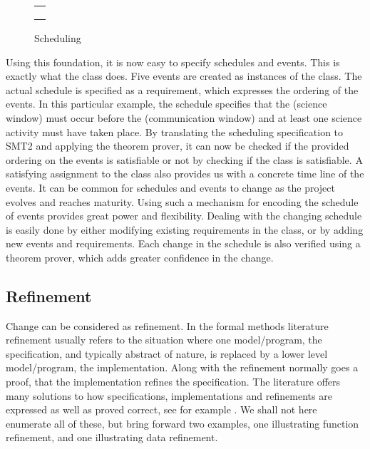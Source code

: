 \begin{figure}[htb]
\centering
\begin{tabular}{c}
\hline \\
 \\ \\
\hline
\end{tabular}
\caption{Scheduling}
\label{fig:scheduling}
\end{figure}

Using this foundation, it is now easy to specify schedules and
events. This is exactly what the  class does. Five
events are created as instances of the  class. The actual
schedule is specified as a requirement, which expresses the ordering
of the events. In this particular example, the schedule specifies that
the  (science window) must occur before the
 (communication window) and at least one science
activity must have taken place. By translating the scheduling
specification to SMT2 and applying the \zthree{} theorem prover, it
can now be checked if the provided ordering on the events is
satisfiable or not by checking if the  class is
satisfiable. A satisfying assignment to the class also provides us
with a concrete time line of the events.  It can be common for
schedules and events to change as the project evolves and reaches
maturity. Using such a mechanism for encoding the schedule of events
provides great power and flexibility. Dealing with the changing
schedule is easily done by either modifying existing requirements 
in the  class, or by adding new events and
requirements. Each change in the schedule is also verified using a
theorem prover, which adds greater confidence in the change.


\subsection{Refinement}

Change can be considered as refinement. In the formal methods literature
refinement usually refers to the situation where one model/program, the 
specification, and typically abstract of nature, is replaced by a lower 
level model/program, the implementation. Along with the refinement normally
goes a proof, that the implementation refines the specification.
The literature offers many solutions to how specifications, implementations and 
refinements are expressed as well as proved correct, see for example 
\cite{vdm78,bjoerner-jones-82,jones90,raise92,george-raise-2008}. We shall not here enumerate all of these, but bring forward two examples, one illustrating function refinement, and one illustrating data refinement.

